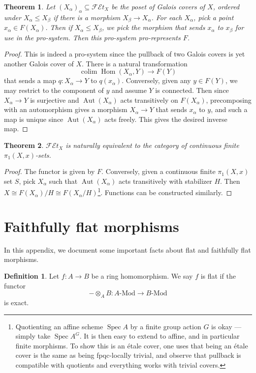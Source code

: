 \documentclass{shortart}
\newtheorem*{thm}{Theorem}
\theoremstyle{definition}
\newtheorem*{defi}{Definition}
\newcommand\FEt[1]{\mathscr{FE}t_{#1}}
\DeclareMathOperator\Spec{Spec}
\DeclareMathOperator\Aut{Aut}
\DeclareMathOperator\Hom{Hom}
\DeclareMathOperator*\colim{colim}
\begin{document}
\begin{thm}
  Let $(X_\alpha)_\alpha \subseteq \FEt{X}$ be the poset of Galois covers of $X$, ordered under $X_\alpha \leq X_\beta$ if there is a morphism $X_\beta \to X_\alpha$. For each $X_\alpha$, pick a point $x_\alpha \in F(X_\alpha)$. Then if $X_\alpha \leq X_\beta$, we pick the morphism that sends $x_\alpha$ to $x_\beta$ for use in the pro-system. Then this pro-system pro-represents $F$.
\end{thm}

\begin{proof}
  This is indeed a pro-system since the pullback of two Galois covers is yet another Galois cover of $X$. There is a natural transformation
  \[
    \colim \Hom(X_\alpha, Y) \to F(Y)
  \]
  that sends a map $q: X_\alpha \to Y$ to $q(x_\alpha)$. Conversely, given any $y \in F(Y)$, we may restrict to the component of $y$ and assume $Y$ is connected. Then since $X_\alpha \to Y$ is surjective and $\Aut(X_\alpha)$ acts transitively on $F(X_\alpha)$, precomposing with an automorphism gives a morphism $X_\alpha \to Y$ that sends $x_\alpha$ to $y$, and such a map is unique since $\Aut(X_\alpha)$ acts freely. This gives the desired inverse map.
\end{proof}

\begin{thm}
  $\FEt{X}$ is naturally equivalent to the category of continuous finite $\pi_1(X, x)$-sets.
\end{thm}

\begin{proof}\leavevmode
  The functor is given by $F$. Conversely, given a continuous finite $\pi_1(X, x)$ set $S$, pick $X_\alpha$ such that $\Aut(X_\alpha)$ acts transitively with stabilizer $H$. Then $X \cong F(X_\alpha)/H \cong F(X_\alpha/H)$\footnote{Quotienting an affine scheme $\Spec A$ by a finite group action $G$ is okay --- simply take $\Spec A^G$. It is then easy to extend to affine, and in particular finite morphisms. To show this is an \'etale cover, one uses that being an \'etale cover is the same as being fpqc-locally trivial, and observe that pullback is compatible with quotients and everything works with trivial covers.}. Functions can be constructed similarly.
\end{proof}

\appendices
\section{Faithfully flat morphisms}
In this appendix, we document some important facts about flat and faithfully flat morphisms.
\begin{defi}
  Let $f: A \to B$ be a ring homomorphism. We say $f$ is flat if the functor
  \[
    -\otimes_A B: A\text{-Mod} \to B\text{-Mod}
  \]
  is exact.
\end{defi}
\end{document}

